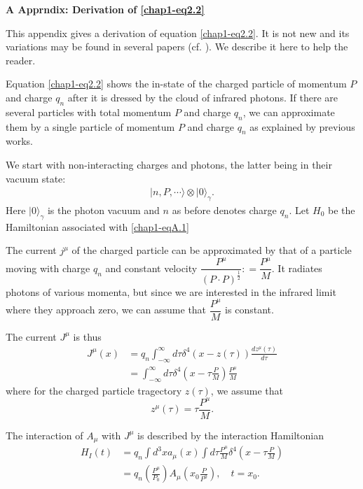\medskip
\noindent \textbf{\large A Apprndix: Derivation of \eqref{chap1-eq2.2}}
\medskip

This appendix gives a derivation of equation \eqref{chap1-eq2.2}. It is not new and its variations may be found in several papers (cf. \cite{key3, key6, key14}). We describe it here to help the reader.

Equation \eqref{chap1-eq2.2} shows the in-state of the charged particle of momentum $P$ and charge $q_n$ after it is dressed by the cloud of infrared photons. If there are several particles with total momentum $P$ and charge $q_n$, we can approximate them by a single particle of momentum $P$ and charge $q_n$ as explained by previous works.

We start with non-interacting charges and photons, the latter being in their vacuum state:
\begin{align*}
  |n, P, \cdots \rangle \otimes | 0 \rangle_\gamma. \label{chap1-eqA.1}\tag{A.1}
\end{align*}
Here $|0 \rangle_\gamma$ is the photon vacuum and $n$ as before denotes charge $q_n$. Let $H_0$ be the Hamiltonian associated with \eqref{chap1-eqA.1}

The current $j^\mu$ of the charged particle can be approximated by that of a particle moving with charge $q_n$ and constant velocity $\dfrac{P^\mu}{(P\cdot P)^{\frac{1}{2}}}: = \dfrac{P^\mu}{M}$. It radiates photons of various momenta, but since we are interested in the infrared limit where they approach zero, we can assume that $\dfrac{P^\mu}{M}$ is constant.

The current $J^\mu$ is thus
\begin{align*}
  J^\mu (x) & = q_n \int^\infty_{-\infty} d \tau \delta^4 (x- z (\tau)) \frac{dz^\mu(\tau)}{d\tau}\\
  & = \int^\infty_{-\infty} d \tau \delta^4 \left(x- \tau \frac{P}{M}\right) \frac{P^\mu}{M}\label{chap1-eqA.2}\tag{A.2}
\end{align*}
where for the charged particle tragectory $z(\tau)$, we assume that
\begin{equation*}
z^\mu (\tau) = \tau \frac{P^\mu}{M}. \label{chap1-eqA.3}\tag{A.3}
\end{equation*}

The interaction of $A_\mu$ with $J^\mu$ is described by the interaction Hamiltonian
\begin{align*}
  H_I(t) & = q_n \int d^3 x a_\mu (x) \int d \tau \frac{P^\mu}{M} \delta^4 \left( x- \tau \frac{P}{M} \right) \label{chap1-eqA.4}\tag{A.4}\\
  & = q_n \left( \frac{P^\mu}{P_0}\right) A_\mu \left( x_0 \frac{P}{P^0}\right), \quad t= x_0. \label{chap1-eqA.5}\tag{A.5}
\end{align*}

